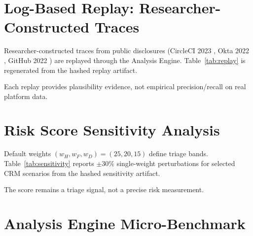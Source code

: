 \documentclass[12pt,a4paper]{report}
\begin{document}
\section{Log-Based Replay: Researcher-Constructed Traces}

Researcher-constructed traces from public disclosures (CircleCI 2023 \cite{circleci2023},
Okta 2022 \cite{okta2022}, GitHub 2022 \cite{github2022}) are replayed through the Analysis Engine. Table~\ref{tab:replay} is
regenerated from the hashed replay artifact.

\begin{table}[H]
    \centering
    \caption{Log-Based Replay: Expected vs.\ Observed Categories}
    \label{tab:replay}
    \footnotesize
    \resizebox{\textwidth}{!}{}
\end{table}

Each replay provides plausibility evidence, not empirical precision/recall on real
platform data.

\section{Risk Score Sensitivity Analysis}

Default weights $(w_H, w_F, w_D) = (25, 20, 15)$ define triage bands. Table~\ref{tab:sensitivity}
reports $\pm 30\%$ single-weight perturbations for selected CRM scenarios from the hashed
sensitivity artifact.

\begin{table}[H]
    \centering
    \caption{Risk Score Sensitivity ($\pm 30\%$ Weight Variation)}
    \label{tab:sensitivity}
    \footnotesize
    
\end{table}

The score remains a triage signal, not a precise risk measurement.

\section{Analysis Engine Micro-Benchmark}

\begin{table}[H]
    \centering
    \caption{Analysis Engine Micro-Benchmark (Synthetic Log Width;
    median/p95/MAD from offline artifact)}
    \label{tab:benchmark}
    \footnotesize
    
\end{table}
\end{document}
